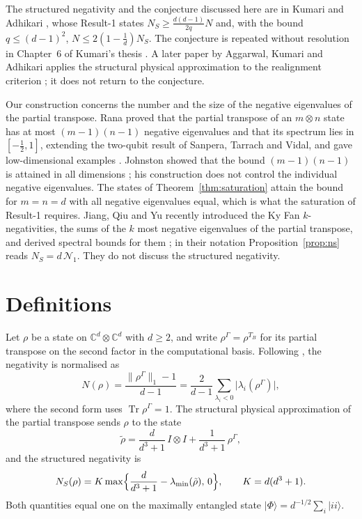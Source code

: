 \documentclass[11pt,a4paper]{article}
\theoremstyle{definition}
\theoremstyle{plain}
\DeclareMathOperator{\Tr}{Tr}
\newcommand{\ket}[1]{\lvert#1\rangle}
\newcommand{\norm}[1]{\lVert#1\rVert}
\newcommand{\C}{\mathbb{C}}
\newcommand{\NS}{N_{S}}
\newcommand{\G}{\Gamma}
\begin{document}
The structured negativity and the conjecture discussed here are in Kumari
and Adhikari \cite{KumariAdhikari2022}, whose Result-1 states
$\NS\ge\frac{d(d-1)}{2q}N$ and, with the bound $q\le(d-1)^2$, $N\le
2(1-\frac1d)\NS$. The conjecture is repeated without resolution in Chapter~6 of
Kumari's thesis \cite{Kumari2023}. A later paper by Aggarwal, Kumari and
Adhikari applies the structural physical approximation to the realignment
criterion \cite{Aggarwal2023}; it does not return to the conjecture.

Our construction concerns the number and the size of the negative eigenvalues
of the partial transpose. Rana proved that the partial transpose of an
$m\otimes n$ state has at most $(m-1)(n-1)$ negative eigenvalues and that its
spectrum lies in $[-\frac12,1]$, extending the two-qubit result of Sanpera,
Tarrach and Vidal, and gave low-dimensional examples
\cite{Rana2013}. Johnston showed that the bound $(m-1)(n-1)$ is attained in
all dimensions \cite{Johnston2013}; his construction does not control the
individual negative eigenvalues. The states of Theorem~\ref{thm:saturation}
attain the bound for $m=n=d$ with all negative eigenvalues equal, which is
what the saturation of Result-1 requires. Jiang, Qiu and Yu recently
introduced the Ky Fan $k$-negativities, the sums of the $k$ most negative
eigenvalues of the partial transpose, and derived spectral bounds for them
\cite{JiangQiuYu2026}; in their notation Proposition~\ref{prop:ns} reads
$\NS=d\,\mathcal{N}_1$. They do not discuss the structured negativity.

\section{Definitions}\label{sec:defs}
Let $\rho$ be a state on $\C^d\otimes\C^d$ with $d\ge2$, and write
$\rho^\G=\rho^{T_B}$ for its partial transpose on the second factor in the
computational basis. Following \cite{KumariAdhikari2022}, the negativity is
normalised as
\begin{equation}\label{eq:N}
N(\rho)=\frac{\norm{\rho^\G}_1-1}{d-1}
=\frac{2}{d-1}\sum_{\lambda_i<0}\lvert\lambda_i(\rho^\G)\rvert ,
\end{equation}
where the second form uses $\Tr\rho^\G=1$. The structural physical
approximation of the partial transpose sends $\rho$ to the state
\begin{equation}\label{eq:spa}
\tilde\rho=\frac{d}{d^3+1}\,I\otimes I+\frac{1}{d^3+1}\,\rho^\G ,
\end{equation}
and the structured negativity is
\begin{equation}\label{eq:NS}
\NS(\rho)=K\max\Bigl\{\frac{d}{d^3+1}-\lambda_{\min}(\tilde\rho),\,0\Bigr\},
\qquad K=d(d^3+1).
\end{equation}
Both quantities equal one on the maximally entangled state
$\ket{\Phi}=d^{-1/2}\sum_i\ket{ii}$.
\end{document}
